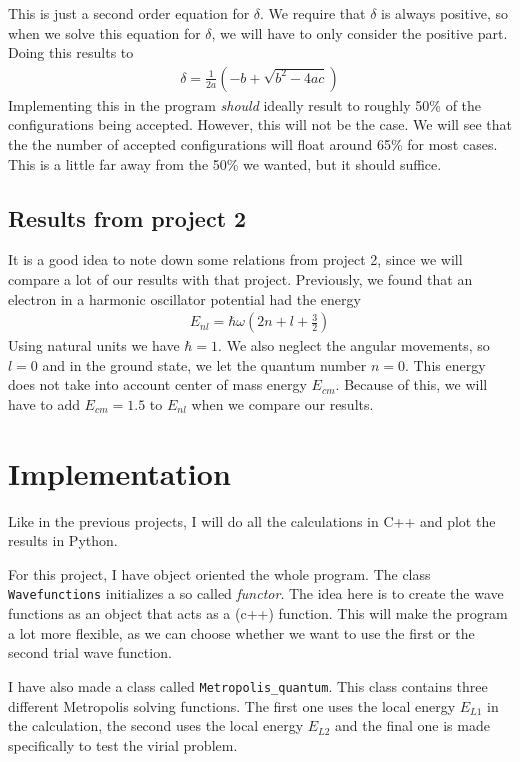 \documentclass[12pt]{article}
\begin{document}
This is just a second order equation for $\delta$. We require that $\delta$ is always positive, so when we solve this equation for $\delta$, we will have to only consider the positive part. Doing this results to
\begin{align}
\delta = \frac{1}{2a}(-b + \sqrt{b^2 - 4ac})
\label{eq:step_length_algo}
\end{align}
Implementing this in the program \emph{should} ideally result to roughly 50\% of the configurations being accepted. However, this will not be the case. We will see that the the number of accepted configurations will float around 65\% for most cases. This is a little far away from the 50\% we wanted, but it should suffice.

\subsection{Results from project 2}
It is a good idea to note down some relations from project 2, since we will compare a lot of our results with that project. Previously, we found that an electron in a harmonic oscillator potential had the energy
\begin{align*}
E_{nl} = \hbar \omega \left(2n + l + \frac{3}{2} \right)
\end{align*}
Using natural units we have $\hbar = 1$. We also neglect the angular movements, so $l = 0$ and in the ground state, we let the quantum number $n=0$. This energy does not take into account center of mass energy $E_{cm}$. Because of this, we will have to add $E_{cm} = 1.5$ to $E_{nl}$ when we compare our results.
\section{Implementation} \label{section:implement}
Like in the previous projects, I will do all the calculations in C++ and plot the results in Python.

For this project, I have object oriented the whole program. The class\\ \texttt{Wavefunctions} initializes a so called \emph{functor}. The idea here is to create the wave functions as an object that acts as a (c++) function. This will make the program a lot more flexible, as we can choose whether we want to use the first or the second trial wave function.

I have also made a class called \texttt{Metropolis\_quantum}. This class contains three different Metropolis solving functions. The first one uses the local energy $E_{L1}$ in the calculation, the second uses the local energy $E_{L2}$ and the final one is made specifically to test the virial problem.
\end{document}
